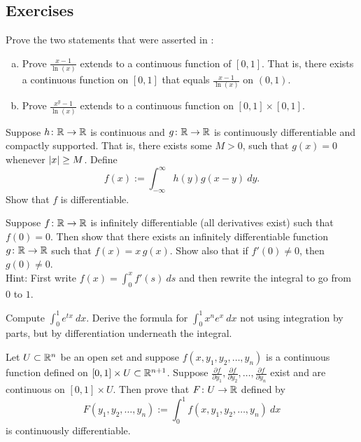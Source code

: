\subsection{Exercises}

\begin{exercise} \label{exercise:counterexamplediffunder}
Prove the two statements that were asserted in
:
\begin{enumerate}[a)]
\item
Prove $\frac{x-1}{\ln(x)}$ extends to a continuous function of
$[0,1]$.  That is, there exists a continuous function on $[0,1]$
that equals $\frac{x-1}{\ln(x)}$ on $(0,1)$.
\item
Prove $\frac{x^y-1}{\ln(x)}$ extends to a continuous function
on $[0,1] \times [0,1]$.
\end{enumerate}
\end{exercise}

\begin{exercise}
Suppose $h \colon {\mathbb{R}} \to {\mathbb{R}}$ is continuous and $g
\colon {\mathbb{R}} \to {\mathbb{R}}$ is continuously differentiable and compactly
supported.  That is, there exists some $M > 0$, such that $g(x) = 0$ whenever
$\left\lvert {x} \right\rvert \geq M$.  Define
\begin{equation*}
f(x) := \int_{-\infty}^\infty h(y)g(x-y)~dy  .
\end{equation*}
Show that $f$ is differentiable.
\end{exercise}

\begin{exercise}
Suppose $f \colon {\mathbb{R}} \to {\mathbb{R}}$ is infinitely differentiable (all derivatives exist)
such that $f(0) = 0$.  Then show that there exists an infinitely
differentiable function $g \colon {\mathbb{R}} \to {\mathbb{R}}$ such that $f(x) = x\,g(x)$.
Show also that
if $f'(0) \not= 0$, then $g(0) \not= 0$.\\
Hint: First write
$f(x) = \int_0^x f'(s) ~ds$ and then rewrite the integral to go
from $0$ to $1$.
\end{exercise}


\begin{exercise}
Compute $\int_0^1 e^{tx} ~dx$.  Derive the formula for
$\int_0^1 x^n e^{x} ~dx$ not using integration by parts, but
by differentiation underneath the integral.
\end{exercise}

\begin{exercise}
Let $U \subset {\mathbb{R}}^n$ be an open set and suppose
$f(x,y_1,y_2,\ldots,y_n)$ is a continuous
function defined on $[0,1] \times U \subset {\mathbb{R}}^{n+1}$.
Suppose
$\frac{\partial f}{\partial y_1},
\frac{\partial f}{\partial y_2},\ldots,
\frac{\partial f}{\partial y_n}$
exist and are continuous on $[0,1] \times U$.
Then prove that $F \colon U \to {\mathbb{R}}$ defined by
\begin{equation*}
F(y_1,y_2,\ldots,y_n) :=
\int_0^1
f(x,y_1,y_2,\ldots,y_n)
~ dx
\end{equation*}
is continuously differentiable.
\end{exercise}

